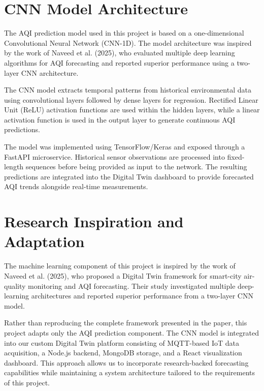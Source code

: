 \documentclass[a4paper, 12pt]{report}
\begin{document}
\section{CNN Model Architecture}

The AQI prediction model used in this project is based on a one-dimensional
Convolutional Neural Network (CNN-1D). The model architecture was inspired
by the work of Naveed et al. (2025), who evaluated multiple deep learning
algorithms for AQI forecasting and reported superior performance using a
two-layer CNN architecture.

The CNN model extracts temporal patterns from historical environmental
data using convolutional layers followed by dense layers for regression.
Rectified Linear Unit (ReLU) activation functions are used within the
hidden layers, while a linear activation function is used in the output
layer to generate continuous AQI predictions.

The model was implemented using TensorFlow/Keras and exposed through a
FastAPI microservice. Historical sensor observations are processed into
fixed-length sequences before being provided as input to the network.
The resulting predictions are integrated into the Digital Twin dashboard
to provide forecasted AQI trends alongside real-time measurements.

\section{Research Inspiration and Adaptation}

The machine learning component of this project is inspired by the work
of Naveed et al. (2025), who proposed a Digital Twin framework for
smart-city air-quality monitoring and AQI forecasting. Their study
investigated multiple deep-learning architectures and reported superior
performance from a two-layer CNN model.

Rather than reproducing the complete framework presented in the paper,
this project adapts only the AQI prediction component. The CNN model is
integrated into our custom Digital Twin platform consisting of MQTT-based
IoT data acquisition, a Node.js backend, MongoDB storage, and a React
visualization dashboard. This approach allows us to incorporate
research-backed forecasting capabilities while maintaining a system
architecture tailored to the requirements of this project.
\end{document}
